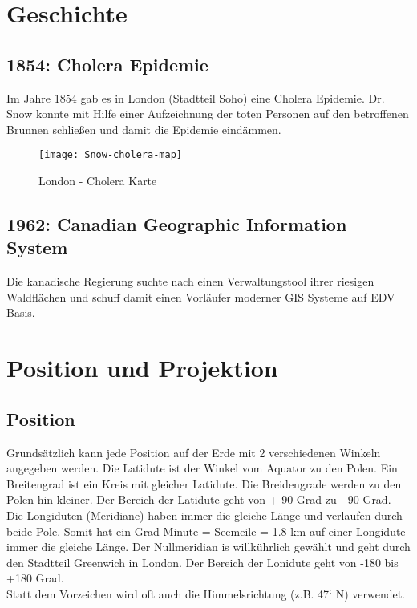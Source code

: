 \documentclass[11pt,fleqn]{book} %
\begin{document}
\chapter{Geschichte}

\section{1854: Cholera Epidemie}
Im Jahre 1854 gab es in London (Stadtteil Soho) eine Cholera Epidemie. Dr. Snow konnte mit Hilfe einer Aufzeichnung der toten Personen auf den betroffenen Brunnen schlie{\ss}en und damit die Epidemie eind\"ammen.

\begin{figure}[h]
\centering\texttt{[image: Snow-cholera-map]}
\caption{London - Cholera Karte}
\end{figure}

\section{1962: Canadian Geographic Information System}
Die kanadische Regierung suchte nach einen Verwaltungstool ihrer riesigen Waldfl\"achen und schuff damit einen Vorl\"aufer moderner GIS Systeme auf EDV Basis. 



\chapter{Position und Projektion}

\section{Position}
Grunds\"atzlich kann jede Position auf der Erde mit 2 verschiedenen Winkeln angegeben werden. Die Latidute ist der Winkel vom Aquator zu den Polen. 
Ein Breitengrad ist ein Kreis mit gleicher Latidute. Die Breidengrade werden zu den Polen hin kleiner. Der Bereich der Latidute geht von + 90 Grad zu - 90 Grad. \\
Die Longiduten (Meridiane) haben immer die gleiche L\"ange und verlaufen durch beide Pole. Somit hat ein Grad-Minute  = Seemeile = 1.8 km auf einer Longidute immer die gleiche L\"ange. Der Nullmeridian is willk\"uhrlich gew\"ahlt und geht durch den Stadtteil Greenwich in London. Der Bereich der Lonidute geht von -180 bis +180 Grad. \\
Statt dem Vorzeichen wird oft auch die Himmelsrichtung (z.B. 47` N) verwendet.   
 
\end{document}

